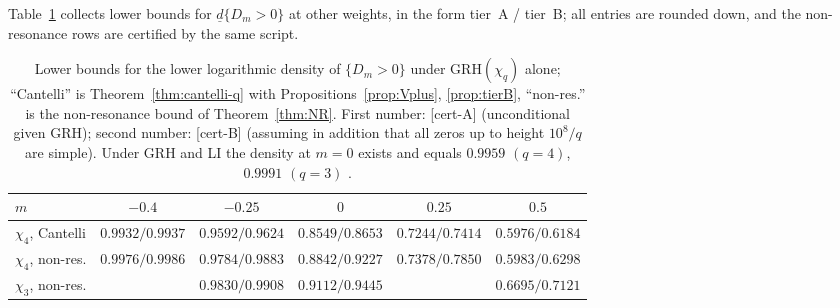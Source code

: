 \documentclass[11pt]{amsart}
\theoremstyle{definition}
\numberwithin{equation}{section}
\newcommand{\dlow}{\underline{d}}
\newcommand{\certA}{\textsf{[cert-A]}}
\newcommand{\certB}{\textsf{[cert-B]}}
\begin{document}
Table~\ref{tab:bias} collects lower bounds for $\dlow\{D_m>0\}$ at
other weights, in the form tier~A / tier~B; all entries are rounded
down, and the non-resonance rows are certified by the same script.

\begin{table}[ht]
\centering
\small
\begin{tabular}{lccccc}
\toprule
$m$ & $-0.4$ & $-0.25$ & $0$ & $0.25$ & $0.5$\\
\midrule
$\chi_4$, Cantelli & $0.9932/0.9937$ &
$0.9592/0.9624$ & $0.8549/0.8653$ & $0.7244/0.7414$ &
$0.5976/0.6184$\\
$\chi_4$, non-res. & $0.9976/0.9986$ &
$0.9784/0.9883$ & $0.8842/0.9227$ & $0.7378/0.7850$ &
$0.5983/0.6298$\\
$\chi_3$, non-res. & & $0.9830/0.9908$ &
$0.9112/0.9445$ & & $0.6695/0.7121$\\
\bottomrule
\end{tabular}
\caption{Lower bounds for the lower logarithmic density of
$\{D_m>0\}$ under GRH$(\chi_q)$ alone; ``Cantelli'' is
Theorem~\ref{thm:cantelli-q} with Propositions~\ref{prop:Vplus},
\ref{prop:tierB}, ``non-res.'' is the non-resonance bound of
Theorem~\ref{thm:NR}. First number: \certA{}
(unconditional given GRH); second number: \certB{} (assuming in
addition that all zeros up to height $10^8/q$ are simple). Under GRH
and LI the density at $m=0$ exists and equals $0.9959$ $(q=4)$,
$0.9991$ $(q=3)$ \cite{RS94}.}
\label{tab:bias}
\end{table}
\end{document}
